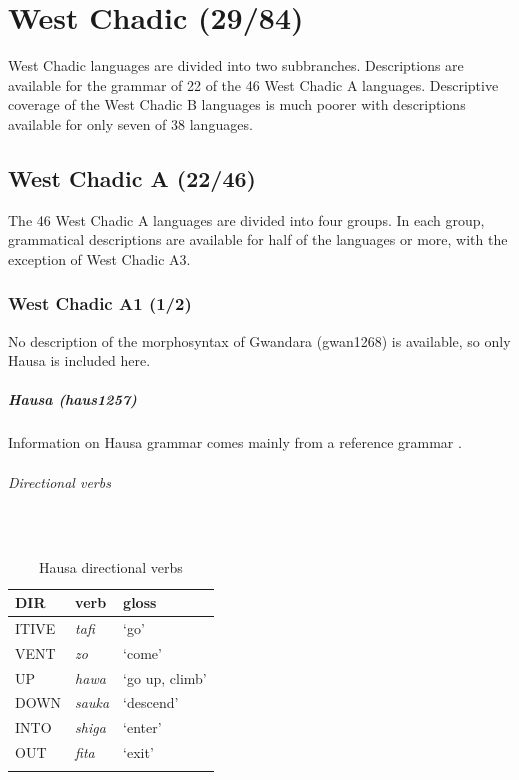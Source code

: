 \chapter{West Chadic (29/84)}

West Chadic languages are divided into two subbranches. Descriptions are available for the grammar of 22 of the 46 West Chadic A languages. Descriptive coverage of the West Chadic B languages is much poorer with descriptions available for only seven of 38 languages. 

\section{West Chadic A (22/46)}

The 46 West Chadic A languages are divided into four groups. In each group, grammatical descriptions are available for half of the languages or more, with the exception of West Chadic A3. 

\subsection{West Chadic A1 (1/2)}

No description of the morphosyntax of Gwandara (gwan1268) is available, so only Hausa is included here.

\paragraph*{Hausa (haus1257)} \label{haus}

Information on Hausa grammar comes mainly from a reference grammar \citep{newmanHausaLanguageEncyclopedic2000}. 

\largerpage
\subparagraph{Directional verbs}~
~


\begin{table}[H]
	\caption{Hausa directional verbs} 
	\label{tab:hausV}
	\begin{tabular}{lll} %
		\lsptoprule
		DIR & verb & gloss   \\ %
		\midrule
		ITIVE & \textit{tafi} & `go' \\
		VENT & \textit{zo} & `come' \\
		UP & \textit{hawa} & `go up, climb' \\
		DOWN & \textit{sauka} & `descend' \\
		INTO& \textit{shiga} & `enter' \\
		OUT & \textit{fita} & `exit' \\
		\lspbottomrule
	\end{tabular}
\end{table}

